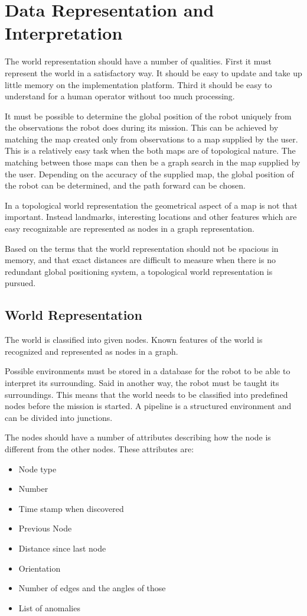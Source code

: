 

\chapter{Data Representation and Interpretation}
\label{chap5}
The world representation should have a number of qualities. First it must represent the
world in a satisfactory way. It should be easy to update and take up little memory on the
implementation platform. Third it should be easy to understand for a human operator
without too much processing. 

It must be possible to determine the global position of the robot uniquely from the
observations the robot does during its mission. This can be achieved by matching the map
created only from observations to a map supplied by the user. This is a relatively easy
task when the both maps are of topological nature. The matching between those maps can
then be a graph search in the map supplied by the user. Depending on the accuracy of the
supplied map, the global position of the robot can be determined, and the path forward can
be chosen. 

In a topological world representation the geometrical aspect of a map is not that
important. Instead landmarks, interesting locations and other features which are easy 
recognizable are represented as nodes in a graph representation. 

Based on the terms that the world representation should not be spacious in memory, and
that exact distances are difficult to measure when there is no redundant global positioning
system, a topological world representation is pursued. 


\section{World Representation}
The world is classified into given nodes. Known features of the world is recognized
and represented as nodes in a graph. 

Possible environments must be stored in a database for the robot to be able to interpret
its surrounding. Said in another way, the robot must be taught its surroundings. 
This means that the world needs to be classified into predefined nodes before the mission
is started. A pipeline is a structured environment and can be divided into junctions. 

The nodes should have a number of attributes describing how the node is different from the
other nodes. These attributes are:
\begin{itemize}
    \item Node type
    \item Number
    \item Time stamp when discovered
    \item Previous Node
    \item Distance since last node
    \item Orientation
    \item Number of edges and the angles of those
    \item List of anomalies
\end{itemize}

